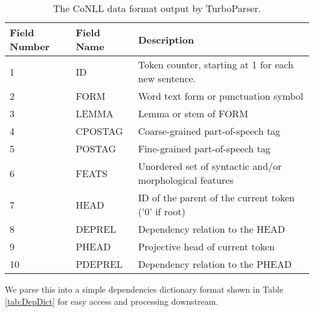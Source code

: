 \begin{table}
\centering
    \begin{tabular}{|l|l|l|}
    \hline
    Field Number & Field Name & Description                                                \\ \hline
    1            & ID         & Token counter, starting at 1 for each new sentence.        \\
    2            & FORM       & Word text form or punctuation symbol                       \\
    3            & LEMMA      & Lemma or stem of FORM                                      \\
    4            & CPOSTAG    & Coarse-grained part-of-speech tag                          \\
    5            & POSTAG     & Fine-grained part-of-speech tag                            \\
    6            & FEATS      & Unordered set of syntactic and/or morphological features   \\
    7            & HEAD       & ID of the parent of the current token ('0' if root)        \\
    8            & DEPREL     & Dependency relation to the HEAD                            \\
    9            & PHEAD      & Projective head of current token                           \\
    10           & PDEPREL    & Dependency relation to the PHEAD                           \\ \hline
    \end{tabular}
\caption{The CoNLL data format output by TurboParser.}
\label{tab:CoNLL}
\end{table}

We parse this into a simple dependencies dictionary format shown in Table \ref{tab:DepDict} for easy access and processing downstream.

